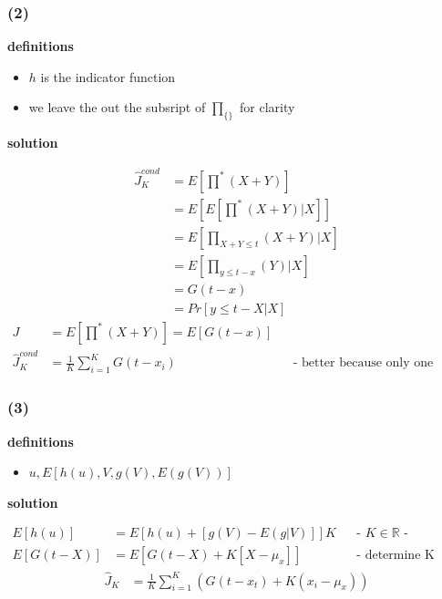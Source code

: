 \subsubsection*{ (2) }

\textbf{definitions}

\begin{itemize}
\item  $h$ is the indicator function
\item  we leave the {} out the subsript of $\prod _{{\{\}}}$ for clarity
\end{itemize}

\textbf{solution}

\begin{align*}
\widehat{J}_{K}^{{cond}}&=E\left[\prod ^{{\ast }}\left(X+Y\right)\right]\\
&=E\left[E\left[\prod ^{{\ast }}\left(X+Y\right)|X\right]\right]\\
&=E\left[\prod _{{X+Y\le t}}\left(X+Y\right)|X\right]\\
&=E\left[\prod _{{y\le t-x}}\left(Y\right)|X\right]\\
&=G\left(t-x\right)\\
&=Pr\left[y\le t-X|X\right]
\end{align*}
\begin{align*}
J&=E\left[\prod ^{{\ast }}\left(X+Y\right)\right]=E\left[G\left(t-x\right)\right]\\
\widehat{J}_{K}^{{cond}}&=\frac{1}{K}\sum _{{i=1}}^{K}G\left(t-x_{i}\right)&& \text{-  better because only one variable to sample -}
\end{align*}

\subsubsection*{ (3) }

\textbf{definitions}

\begin{itemize}
\item  $u,E\left[h\left(u\right),V,g\left(V\right),E\left(g\left(V\right)\right)\right]$
\end{itemize}

\textbf{solution}

\begin{align*}
E\left[h\left(u\right)\right]&=E\left[h\left(u\right)+\left[g\left(V\right)-E\left(g|V\right)\right]\right]K&& \text{-  $K\in \mathbb{R}$ -}\\
E\left[G\left(t-X\right)\right]&=E\left[G\left(t-X\right)+K\left[X-\mu _{x}\right]\right]&& \text{-  determine K online -}
\end{align*}
\begin{align*}
\widehat{J}_{K}&=\frac{1}{K}\sum _{{i=1}}^{K}\left(G\left(t-x_{t}\right)+K\left(x_{i}-\mu _{x}\right)\right)
\end{align*}

\pagebreak